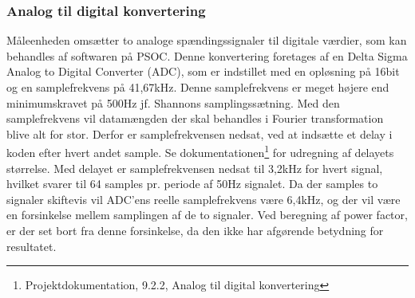 
\subsubsection{Analog til digital konvertering}
Måleenheden omsætter to analoge spændingssignaler til digitale værdier, som kan behandles af softwaren på PSOC. Denne konvertering foretages af en Delta Sigma Analog to Digital Converter (ADC), som er indstillet med en opløsning på 16bit og en samplefrekvens på 41,67kHz. Denne samplefrekvens er meget højere end minimumskravet på 500Hz jf. Shannons samplingssætning. Med den samplefrekvens vil datamængden der skal behandles i Fourier transformation blive alt for stor. Derfor er samplefrekvensen nedsat, ved at indsætte et delay i koden efter hvert andet sample. Se dokumentationen\footnote{Projektdokumentation, 9.2.2, Analog til digital konvertering} for udregning af delayets størrelse. Med delayet er samplefrekvensen nedsat til 3,2kHz for hvert signal, hvilket svarer til 64 samples pr. periode af 50Hz signalet. Da der samples to signaler skiftevis vil ADC'ens reelle samplefrekvens være 6,4kHz, og der vil være en forsinkelse mellem samplingen af de to signaler. Ved beregning af power factor, er der set bort fra denne forsinkelse, da den ikke har afgørende betydning for resultatet.  
